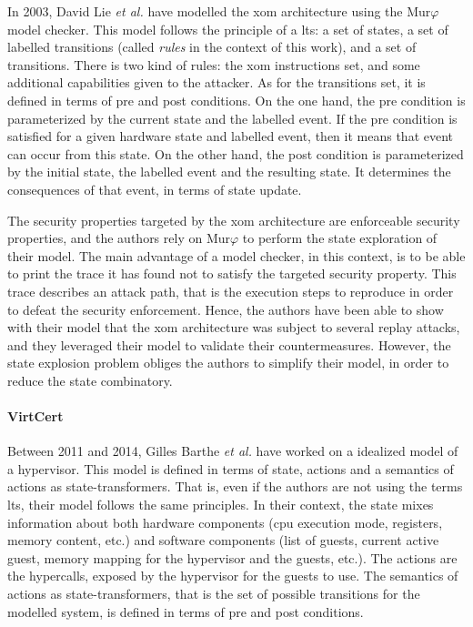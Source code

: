 In 2003, David Lie \emph{et al.} have modelled the \ac{xom} architecture using
the Mur$\varphi$ model checker.
%
This model follows the principle of a \ac{lts}: a set of states, a set of
labelled transitions (called \emph{rules} in the context of this work), and a
set of transitions.
%
There is two kind of rules: the \ac{xom} instructions set, and some additional
capabilities given to the attacker.
%
As for the transitions set, it is defined in terms of pre and post conditions.
%
On the one hand, the pre condition is parameterized by the current state and the
labelled event.
%
If the pre condition is satisfied for a given hardware state and labelled event,
then it means that event can occur from this state.
%
On the other hand, the post condition is parameterized by the initial state, the
labelled event and the resulting state.
%
It determines the consequences of that event, in terms of state update.

The security properties targeted by the \ac{xom} architecture are enforceable
security properties, and the authors rely on Mur$\varphi$ to perform the state
exploration of their model.
%
The main advantage of a model checker, in this context, is to be able to print
the trace it has found not to satisfy the targeted security property.
%
This trace describes an attack path, that is the execution steps to reproduce in
order to defeat the security enforcement.
%
Hence, the authors have been able to show with their model that the \ac{xom}
architecture was subject to several replay attacks, and they leveraged their
model to validate their countermeasures.
%
However, the state explosion problem obliges the authors to simplify their
model, in order to reduce the state combinatory.

\paragraph{VirtCert}
%
Between 2011 and 2014, Gilles Barthe \emph{et al.} have worked on a idealized
model of a hypervisor.
%
This model is defined in terms of state, actions and a semantics of actions as
state-transformers.
%
That is, even if the authors are not using the terms \ac{lts}, their model
follows the same principles.
%
In their context, the state mixes information about both hardware components
(\ac{cpu} execution mode, registers, memory content, etc.) and software
components (list of guests, current active guest, memory mapping for the
hypervisor and the guests, etc.).
%
The actions are the hypercalls, exposed by the hypervisor for the guests to use.
%
The semantics of actions as state-transformers, that is the set of possible
transitions for the modelled system, is defined in terms of pre and post
conditions.

